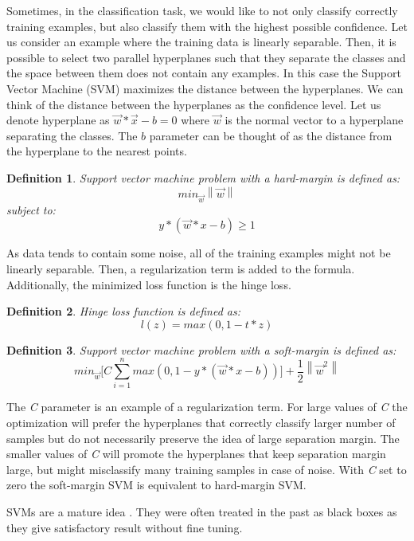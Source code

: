 \documentclass{pracamgr}
\newtheorem{mydef}{Definition}
\begin{document}
Sometimes, in the classification task, we would like to not only classify correctly training
examples, but also classify them with the highest possible confidence. Let us consider an example
where the training data is linearly separable. Then,
it is possible to select two parallel hyperplanes such that they separate the classes and
the space between them does not contain any examples.
In this case the Support Vector Machine (SVM) maximizes the distance between
the hyperplanes. We can think of the distance between the hyperplanes as the
confidence level. Let us denote hyperplane as $\vec{w}*\vec{x} - b = 0$ where $\vec{w}$
is the normal vector to a hyperplane separating the classes. The $b$ parameter
can be thought of as the distance from the hyperplane to the nearest points.

\begin{mydef}
Support vector machine problem with a \textit{hard-margin} is defined as:
\[min_{\vec{w}} \left\lVert{\vec{w}}\right\rVert\]
subject to:
\[y*(\vec{w}*x -b) \ge 1\]
\end{mydef}

As data tends to contain some noise, all of the training examples
might not be linearly separable. Then, a regularization term is added to the formula.
Additionally, the minimized loss function is the hinge loss.

\begin{mydef}
Hinge loss function is defined as:
\[l(z) = max(0,1-t * z)\]
\end{mydef}

\begin{mydef}
Support vector machine problem with a \textit{soft-margin} is defined as:
\[min_{\vec{w}}\Bigg[C\sum_{i=1}^{n}max(0, 1 - y*(\vec{w}*x -b))\Bigg] + \frac{1}{2}\left\lVert{\vec{w}^{2}}\right\rVert\]
\end{mydef}

The \textit{C} parameter is an example of a regularization term. For large values of \textit{C} the
optimization will prefer the hyperplanes that correctly classify larger number of samples but
do not necessarily preserve the idea of large separation margin. The
smaller values of \textit{C} will promote the hyperplanes that keep separation margin large, but
might misclassify many training samples in case of noise. With \textit{C} set to zero the 
soft-margin SVM is equivalent to hard-margin SVM.

SVMs are a mature idea \citep{VapLer63}. They were often treated in the past as black boxes
as they give satisfactory result without fine tuning.
\end{document}
